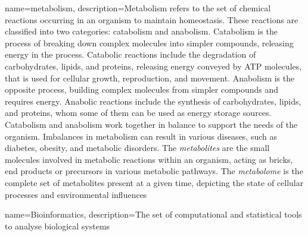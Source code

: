 {name=metabolism, 
description={Metabolism refers to the set of chemical reactions occurring in an organism to maintain homeostasis. These reactions are classified into two categories: catabolism and anabolism. Catabolism is the process of breaking down complex molecules into simpler compounds, releasing energy in the process. Catabolic reactions include the degradation of carbohydrates, lipids, and proteins, releasing energy conveyed by ATP molecules, that is used for cellular growth, reproduction, and movement. Anabolism is the opposite process,  building complex molecules from simpler compounds and requires energy. Anabolic reactions include the synthesis of carbohydrates, lipids, and proteins, whom some of them can be used as energy storage sources. Catabolism and anabolism work together in balance to support the needs of the organism. Imbalances in metabolism can result in various diseases, such as diabetes, obesity, and metabolic disorders.
The \textit{metabolites} are the small molecules involved in metabolic reactions within an organism, acting as bricks, end products or precursors in various metabolic pathways. The \textit{metabolome} is the complete set of metabolites present at a given time, depicting the state of cellular processes and environmental influences}}

{name=Bioinformatics, 
description={The set of computational and statistical tools to analyse biological systems}}

